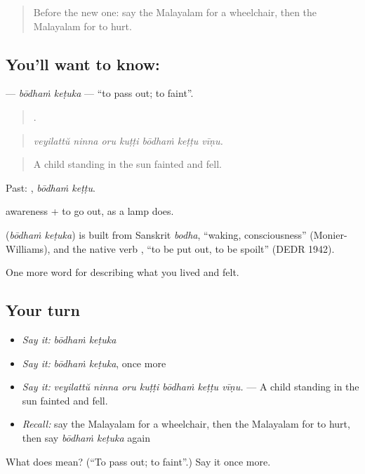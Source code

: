 \begin{quote}
Before the new one: say the Malayalam for a wheelchair, then the Malayalam for to hurt.
\end{quote}

\subsection*{You'll want to know:  }
\textbf{ } — \emph{bōdhaṁ keṭuka} — \textquotedblleft{}to pass out; to faint\textquotedblright{}.

\begin{quote}
      .
\end{quote}

\begin{quote}
\emph{veyilattŭ ninna oru kuṭṭi bōdhaṁ keṭṭu vīṇu.}
\end{quote}

\begin{quote}
A child standing in the sun fainted and fell.
\end{quote}

Past:  , \emph{bōdhaṁ keṭṭu}.

 awareness +  to go out, as a lamp does.

\begin{cousinweb}
\textbf{ } (\emph{bōdhaṁ keṭuka}) is built from Sanskrit \emph{bodha}, \textquotedblleft{}waking, consciousness\textquotedblright{} (Monier-Williams), and the native verb , \textquotedblleft{}to be put out, to be spoilt\textquotedblright{} (DEDR 1942).
\end{cousinweb}

\begin{grammarlens}[title={What you've built}]
One more word for describing what you lived and felt.
\end{grammarlens}

\subsection*{Your turn}
\begin{itemize}
\raggedright
  \item \emph{Say it:} \emph{bōdhaṁ keṭuka}
  \item \emph{Say it:} \emph{bōdhaṁ keṭuka}, once more
  \item \emph{Say it:} \emph{veyilattŭ ninna oru kuṭṭi bōdhaṁ keṭṭu vīṇu.} — A child standing in the sun fainted and fell.
  \item \emph{Recall:} say the Malayalam for a wheelchair, then the Malayalam for to hurt, then say \emph{bōdhaṁ keṭuka} again
\end{itemize}

\begin{tcolorbox}[breakable,colback=teal!4,colframe=teal!35!black,title={Before you move on}]
What does   mean? (\textquotedblleft{}To pass out; to faint\textquotedblright{}.) Say it once more.
\end{tcolorbox}
